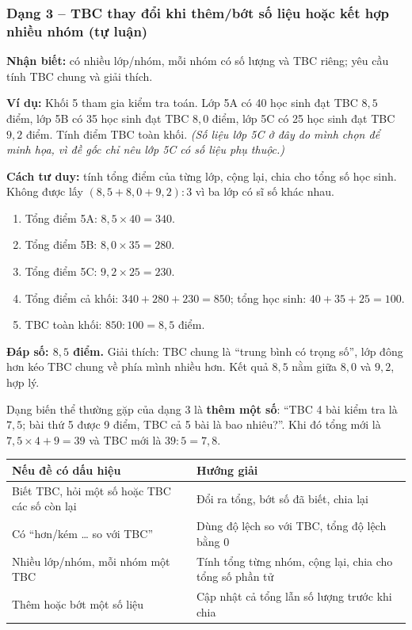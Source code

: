 \documentclass[../main.tex]{subfiles}
\begin{document}
\subsubsection{Dạng 3 -- TBC thay đổi khi thêm/bớt số liệu hoặc kết hợp nhiều nhóm (tự luận)}
\textbf{Nhận biết:} có nhiều lớp/nhóm, mỗi nhóm có số lượng và TBC riêng; yêu cầu tính TBC chung và giải thích.
\begin{vd}
    \textbf{Ví dụ:} Khối 5 tham gia kiểm tra toán. Lớp 5A có 40 học sinh đạt TBC $8{,}5$ điểm, lớp 5B có 35 học sinh đạt TBC $8{,}0$ điểm, lớp 5C có 25 học sinh đạt TBC $9{,}2$ điểm. Tính điểm TBC toàn khối. \textit{(Số liệu lớp 5C ở đây do mình chọn để minh họa, vì đề gốc chỉ nêu lớp 5C có số liệu phụ thuộc.)}
\end{vd}
\textbf{Cách tư duy:} tính tổng điểm của từng lớp, cộng lại, chia cho tổng số học sinh. Không được lấy $(8{,}5 + 8{,}0 + 9{,}2) : 3$ vì ba lớp có sĩ số khác nhau.
\begin{enumerate}
    \item Tổng điểm 5A: $8{,}5 \times 40 = 340$.
    \item Tổng điểm 5B: $8{,}0 \times 35 = 280$.
    \item Tổng điểm 5C: $9{,}2 \times 25 = 230$.
    \item Tổng điểm cả khối: $340 + 280 + 230 = 850$; tổng học sinh: $40 + 35 + 25 = 100$.
    \item TBC toàn khối: $850 : 100 = 8{,}5$ điểm.
\end{enumerate}
\textbf{Đáp số: $8{,}5$ điểm.} Giải thích: TBC chung là ``trung bình có trọng số'', lớp đông hơn kéo TBC chung về phía mình nhiều hơn. Kết quả $8{,}5$ nằm giữa $8{,}0$ và $9{,}2$, hợp lý.

\medskip
Dạng biến thể thường gặp của dạng 3 là \textbf{thêm một số}: ``TBC 4 bài kiểm tra là $7{,}5$; bài thứ 5 được 9 điểm, TBC cả 5 bài là bao nhiêu?''. Khi đó tổng mới là $7{,}5 \times 4 + 9 = 39$ và TBC mới là $39 : 5 = 7{,}8$.

\begin{center}
\begin{tabular}{|S{7.6cm}|S{7.6cm}|}
    \hline
    \textbf{Nếu đề có dấu hiệu} & \textbf{Hướng giải} \\
    \hline
    Biết TBC, hỏi một số hoặc TBC các số còn lại & Đổi ra tổng, bớt số đã biết, chia lại \\
    \hline
    Có ``hơn/kém \dots{} so với TBC'' & Dùng độ lệch so với TBC, tổng độ lệch bằng 0 \\
    \hline
    Nhiều lớp/nhóm, mỗi nhóm một TBC & Tính tổng từng nhóm, cộng lại, chia cho tổng số phần tử \\
    \hline
    Thêm hoặc bớt một số liệu & Cập nhật cả tổng lẫn số lượng trước khi chia \\
    \hline
\end{tabular}
\end{center}
\end{document}
